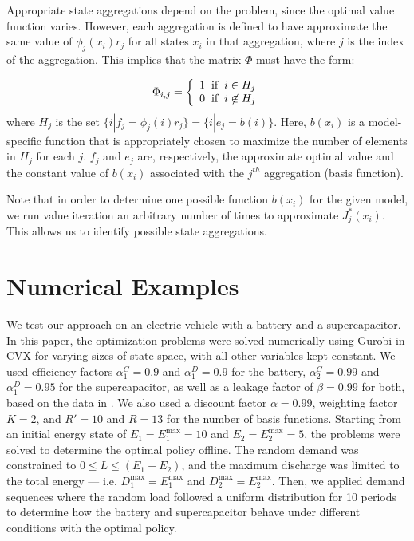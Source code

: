 \documentclass[conference]{IEEEtran}
\begin{document}
    Appropriate state aggregations depend on the problem, since the optimal value function varies. %
    However, each aggregation is defined to have approximate the same value of $\phi_{j}(x_{i})r_{j}$ for all states $x_{i}$ in that aggregation, where $j$ is the index of the aggregation. This implies that the matrix $\Phi$ must have the form:
    
    \begin{displaymath}
        \Phi_{i,j}=\left\{
            \begin{array}{l}
            1 \hspace{0.2cm} \text{if} \hspace{0.2cm} i\in H_{j}\\
            0 \hspace{0.2cm} \text{if} \hspace{0.2cm} i\not\in H_{j}
            \end{array}
            \right.
    \end{displaymath}where $H_{j}$ is the set $\{i|f_{j} = \phi_{j}(i)r_{j}\}=\{i|e_{j} = b(i)\}$. Here, $b(x_{i})$ is a model-specific function that is appropriately chosen to maximize the number of elements in $H_{j}$ for each $j$. $f_{j}$ and $e_{j}$ are, respectively, the approximate optimal value and the constant value of $b(x_{i})$ associated with the $j^{th}$ aggregation (basis function).
	
	Note that in order to determine one possible function $b(x_{i})$ for the given model, we run value iteration an arbitrary number of times to approximate $J^{*}_{j}(x_{i})$. This allows us to identify possible state aggregations.
    

\section{Numerical Examples}
We test our approach on an electric vehicle with a battery and a supercapacitor. In this paper, the optimization problems were solved numerically using Gurobi in CVX for varying sizes of state space, with all other variables kept constant. We used efficiency factors $\alpha^{C}_{1}=0.9$ and $\alpha^{D}_{1}=0.9$ for the battery, $\alpha^{C}_{2}=0.99$ and $\alpha^{D}_{1}=0.95$ for the supercapacitor, as well as a leakage factor of $\beta=0.99$ for both, based on the data in \cite{BattSupercapEff}. We also used a discount factor $\alpha=0.99$, weighting factor $K=2$, and $R'=10$ and $R=13$ for the number of basis functions. Starting from an initial energy state of $E_{1}=E_{1}^{\max}=10$ and $E_{2}=E_{2}^{\max}=5$, the problems were solved to determine the optimal policy offline. The random demand was constrained to $0\leq L \leq (E_{1}+E_{2})$, and the maximum discharge was limited to the total energy --- i.e. $D_{1}^{\max}=E_{1}^{\max}$ and $D_{2}^{\max}=E_{2}^{\max}$. Then, we applied demand sequences where the random load followed a uniform distribution for 10 periods to determine how the battery and supercapacitor behave under different conditions with the optimal policy.
\end{document}
